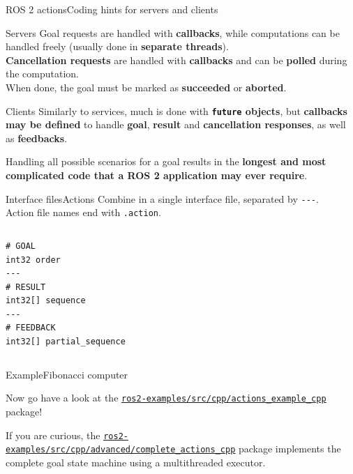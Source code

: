 \begin{frame}{ROS 2 actions}{Coding hints for servers and clients}
  \begin{block}{Servers}
    \justifying
    Goal requests are handled with \textbf{callbacks}, while computations can be handled freely (usually done in \textbf{separate threads}).\\
    \textbf{Cancellation requests} are handled with \textbf{callbacks} and can be \textbf{polled} during the computation.\\
    When done, the goal must be marked as \textbf{succeeded} or \textbf{aborted}.
  \end{block}
  \begin{block}{Clients}
    \justifying
    Similarly to services, much is done with \textbf{\texttt{future} objects}, but \textbf{callbacks may be defined} to handle \textbf{goal}, \textbf{result} and \textbf{cancellation responses}, as well as \textbf{feedbacks}.
  \end{block}
  \begin{block}{}
    \centering
    Handling all possible scenarios for a goal results in the \textbf{longest and most complicated code that a ROS 2 application may ever require}. {\Large\smiley{}}
  \end{block}
\end{frame}

\begin{frame}[fragile]{Interface files}{Actions}
  \justifying
  Combine  in a single interface file, separated by \texttt{-{}-{}-}.\\
  Action file names end with \texttt{.action}.
  \begin{columns}
    \begin{lstlisting}[language=ros2msg, caption=Definition of the \texttt{ros2\_examples\_interfaces/action/Fibonacci} action.]
# GOAL
int32 order
---
# RESULT
int32[] sequence
---
# FEEDBACK
int32[] partial_sequence
    \end{lstlisting}
  \end{columns}
\end{frame}

\begin{frame}{Example}{Fibonacci computer}
  \justifying
  \begin{block}{}
    \centering
    Now go have a look at the \href{https://github.com/IntelligentSystemsLabUTV/ros2-examples/tree/jazzy/src/cpp/actions_example_cpp}{\color{blue}\underline{\texttt{ros2-examples/src/cpp/actions\_example\_cpp}}} package!
  \end{block}
  \bigskip
  If you are curious, the \href{https://github.com/IntelligentSystemsLabUTV/ros2-examples/tree/jazzy/src/cpp/advanced/complete_actions_cpp}{\color{blue}\underline{\texttt{ros2-examples/src/cpp/advanced/complete\_actions\_cpp}}} package implements the complete goal state machine using a multithreaded executor.
\end{frame}
